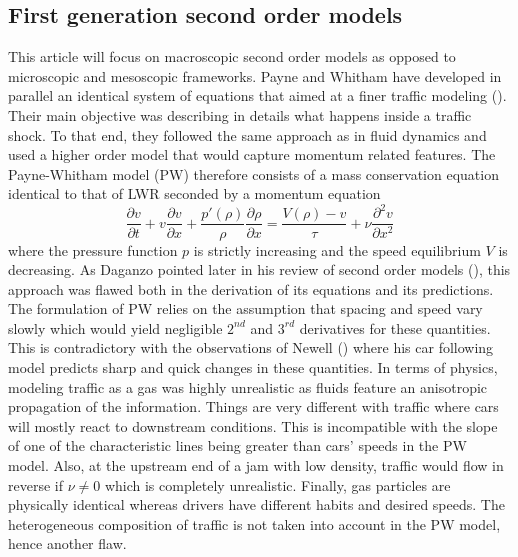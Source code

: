 \documentclass[preprint]{elsarticle}
\begin{document}
\subsection{First generation second order models}
This article will focus on macroscopic second order models as opposed
to microscopic and mesoscopic frameworks. Payne and Whitham have developed
in parallel an identical system of equations that aimed at a finer
traffic modeling (\cite{payne1971models,whitham1974linear}). Their
main objective was describing in details what happens inside a traffic shock.
To that end, they followed the same approach as in fluid dynamics
and used a higher order model that would capture momentum related
features. The Payne-Whitham model (PW) therefore consists of a mass
conservation equation identical to that of LWR seconded by a momentum
equation 
\begin{equation}
\frac{\partial v}{\partial t}+v\frac{\partial v}{\partial x}+\frac{p'\left(\rho\right)}{\rho}\frac{\partial\rho}{\partial x}=\frac{V\left(\rho\right)-v}{\tau}+\nu\frac{\partial^{2}v}{\partial x^{2}}
\end{equation}
where the pressure function $p$ is strictly increasing and the speed
equilibrium $V$ is decreasing. As Daganzo pointed later in his review
of second order models (\cite{Dag_requiem}), this approach was flawed
both in the derivation of its equations and its predictions. The formulation
of PW relies on the assumption that spacing and speed vary slowly
which would yield negligible $2^{nd}$ and $3^{rd}$ derivatives for
these quantities. This is contradictory with the observations of Newell
(\cite{Newel}) where his car following model predicts sharp and quick
changes in these quantities. In terms of physics, modeling traffic
as a gas was highly unrealistic as fluids feature an anisotropic
propagation of the information. Things are very different with traffic
where cars will mostly react to downstream conditions. This is incompatible
with the slope of one of the characteristic lines being greater than
cars' speeds in the PW model. Also, at the upstream end of a jam with
low density, traffic would flow in reverse if $\nu\neq0$ which is
completely unrealistic. Finally, gas particles are physically identical
whereas drivers have different habits and desired speeds. The heterogeneous
composition of traffic is not taken into account in the PW model,
hence another flaw.
\end{document}
